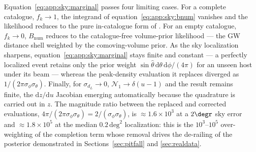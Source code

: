 Equation~\eqref{eq:app:sky:marginal} passes four limiting cases. For a
complete catalogue, $f_k \to 1$, the integrand of
equation~\eqref{eq:app:sky:bnum} vanishes and the likelihood reduces to the
pure in-catalogue form of \citet{Gray:2019ksv}. For an empty catalogue,
$f_k \to 0$, $B_\mathrm{num}$ reduces to the catalogue-free volume-prior
likelihood --- the GW distance shell weighted by the comoving-volume prior. As
the sky localization sharpens, equation~\eqref{eq:app:sky:marginal} stays
finite and constant --- a perfectly localized event retains only the prior
weight $\sin\hat\theta\,\mathrm{d}\theta\,\mathrm{d}\phi/(4\pi)$ for an unseen
host under its beam --- whereas the peak-density evaluation it replaces
diverged as $1/(2\pi\sigma_\phi\sigma_\theta)$. Finally, for
$\sigma_{d_L} \to 0$, $\mathcal{N}_1 \to \delta(u-1)$ and the result remains
finite, the $\mathrm{d}z/\mathrm{d}u$ Jacobian emerging automatically because
the quadrature is carried out in $z$. The magnitude ratio between the replaced
and corrected evaluations, $4\pi/(2\pi\sigma_\phi\sigma_\theta) =
2/(\sigma_\phi\sigma_\theta)$, is $\approx 1.6\times10^{3}$ at a $2\degr$ sky
error and $\approx 1.8\times10^{5}$ at the median $0.2\,\mathrm{deg}^2$ %
localization: this is the $10^{3}$--$10^{5}$ over-weighting of the completion
term whose removal drives the de-railing of the posterior demonstrated in
Sections~\ref{sec:pitfall} and \ref{sec:realdata}.
